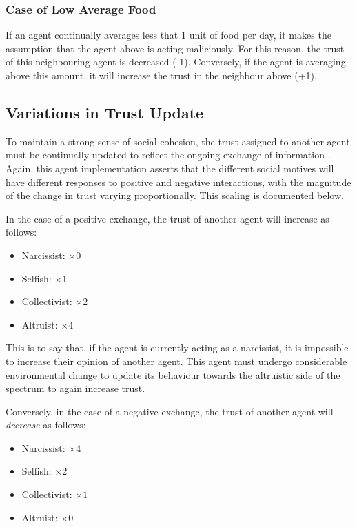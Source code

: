 \subsubsection{Case of Low Average Food} \label{sec:lowFood}

If an agent continually averages less that 1 unit of food per day, it makes the assumption that the agent above is acting maliciously. For this reason, the trust of this neighbouring agent is decreased (-1). Conversely, if the agent is averaging above this amount, it will increase the trust in the neighbour above (+1).

\subsection{Variations in Trust Update} \label{sec:varTrust}

To maintain a strong sense of social cohesion, the trust assigned to another agent must be continually updated to reflect the ongoing exchange of information \cite{trustEEE}. Again, this agent implementation asserts that the different social motives will have different responses to positive and negative interactions, with the magnitude of the change in trust varying proportionally. This scaling is documented below.

In the case of a positive exchange, the trust of another agent will increase as follows:

\begin{itemize}
    \item Narcissist: $\times 0$
    \item Selfish: $\times 1$
    \item Collectivist: $\times 2$
    \item Altruist: $\times 4$
\end{itemize}

This is to say that, if the agent is currently acting as a narcissist, it is impossible to increase their opinion of another agent. This agent must undergo considerable environmental change to update its behaviour towards the altruistic side of the spectrum to again increase trust.

Conversely, in the case of a negative exchange, the trust of another agent will \textit{decrease} as follows:

\begin{itemize}
    \item Narcissist: $\times 4$
    \item Selfish: $\times 2$
    \item Collectivist: $\times 1$
    \item Altruist: $\times 0$
\end{itemize}

